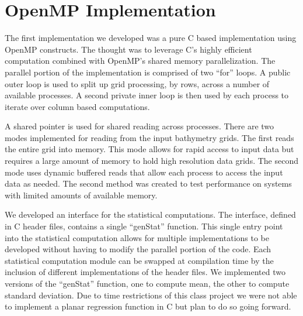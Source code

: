 \section{OpenMP Implementation}

The first implementation we developed was a pure C based implementation using OpenMP constructs. 
The thought was to leverage C’s highly efficient computation combined with OpenMP's shared memory parallelization. 
The parallel portion of the implementation is comprised of two “for” loops. 
A public outer loop is used to split up grid processing, by rows, across a number of available processes. 
A second private inner loop is then used by each process to iterate over column based computations.

\par
A shared pointer is used for shared reading across processes. 
There are two modes implemented for reading from the input bathymetry grids. 
The first reads the entire grid into memory. 
This mode allows for rapid access to input data but requires a large amount of memory to hold high resolution data grids.  
The second mode uses dynamic buffered reads that allow each process to access the input data as needed. 
The second method was created to test performance on systems with limited amounts of available memory.

\par
We developed an interface for the statistical computations.  
The interface, defined in C header files, contains a single “genStat” function. 
This single entry point into the statistical computation allows for multiple implementations to be developed without having to modify the parallel portion of the code. 
Each statistical computation module can be swapped at compilation time by the inclusion of different implementations of the header files. 
We implemented two versions of the “genStat” function, one to compute mean, the other to compute standard deviation. 
Due to time restrictions of this class project we were not able to implement a planar regression function in C but plan to do so going forward. 